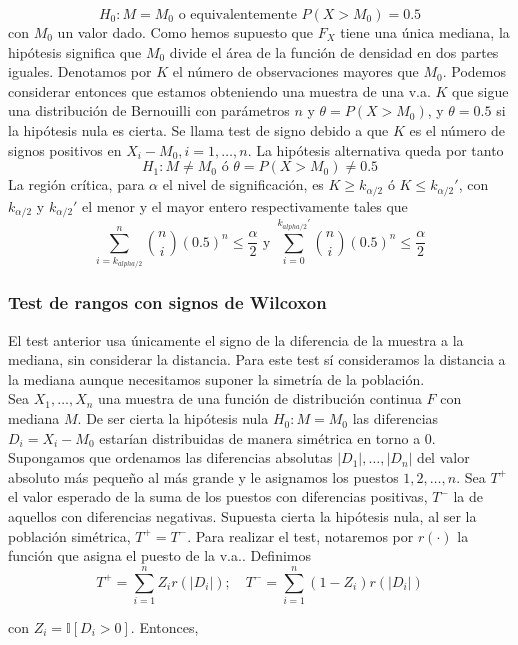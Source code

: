 	\[ H_0: M = M_0	\text{ o equivalentemente }
			P(X > M_0) = 0.5 \]
	con $M_0$ un valor dado. Como hemos supuesto que $F_X$ 
tiene una única mediana, la hipótesis significa que $M_0$ 
divide el área de la función de densidad en dos partes 
iguales. Denotamos por $K$ el número de observaciones mayores 
que $M_0$. Podemos considerar entonces que estamos obteniendo 
una muestra de una v.a. $K$ que sigue una distribución de 
Bernouilli con parámetros $n$ y $\theta=P(X>M_0)$, y 
$\theta=0.5$ si la hipótesis nula es cierta. Se llama test de 
signo debido a que $K$ es el número de signos positivos en 
$X_i - M_0, i = 1, \dots, n$. La hipótesis alternativa queda 
por tanto
	\[ H_1: M \neq M_0	\text{ ó }
			\theta = P(X > M_0) \neq 0.5 \]
	La región crítica, para $\alpha$ el nivel de 
significación, es $K \geq k_{\alpha/2}$ ó $K \leq 
k_{\alpha/2}'$, con $k_{\alpha/2}$ y $k_{\alpha/2}'$ el menor 
y el mayor entero respectivamente tales que
	\[ \sum\limits_{i=k_{alpha/2}}^n
			{n \choose i}(0.5)^n \leq \frac{\alpha}{2}
		\text{ y }
		\sum\limits_{i=0}^{k_{alpha/2}'}
			{n \choose i}(0.5)^n \leq \frac{\alpha}{2}
	\]

\subsubsection{Test de rangos con signos de Wilcoxon}

	El test anterior usa únicamente el signo de la diferencia 
de la muestra a la mediana, sin considerar la distancia. Para 
este test sí consideramos la distancia a la mediana aunque 
necesitamos suponer la simetría de la población. \\
	Sea $X_1, \dots, X_n$ una muestra de una función de 
distribución continua $F$ con mediana $M$. De ser cierta la 
hipótesis nula $H_0: M = M_0$ las diferencias $D_i = X_i - 
M_0$ estarían distribuidas de manera simétrica en torno 
a 0.\\
	Supongamos que ordenamos las diferencias absolutas 
$|D_1|, \dots, |D_n|$ del valor absoluto más pequeño al más 
grande y le asignamos los puestos $1, 2, \dots, n$. Sea $T^+$ 
el valor esperado de la suma de los puestos con diferencias 
positivas, $T^-$ la de aquellos con diferencias negativas. 
Supuesta cierta la hipótesis nula, al ser la población 
simétrica, $T^+ = T^-$. Para realizar el test, notaremos por
$r(\cdot)$ la función que asigna el puesto de la v.a.. 
Definimos
	\[ T^+ = \sum\limits_{i=1}^n Z_i r(|D_i|); \quad
	   T^- = \sum\limits_{i=1}^n (1-Z_i) r(|D_i|) \]
	   
	 con $ Z_i = \mathbb{I}[ D_i > 0 ]$. Entonces,
	 		

